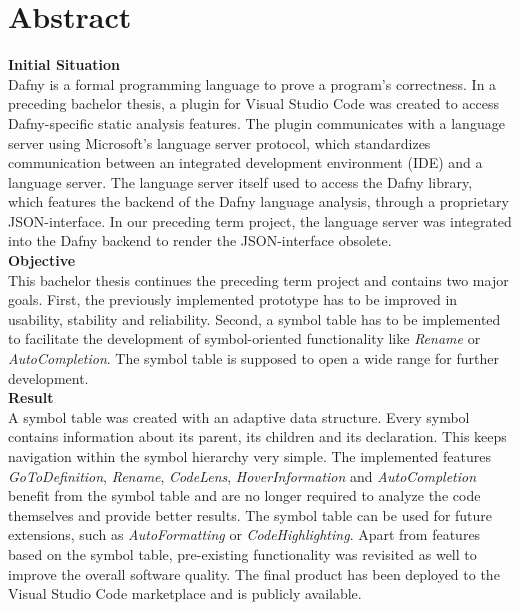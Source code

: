 \section{Abstract}
\label{section:abstract}

\textbf{Initial Situation}\\
Dafny is a formal programming language to prove a program's correctness.
In a preceding bachelor thesis, a plugin for Visual Studio Code was created to access Dafny-specific static analysis features.
The plugin communicates with a language server using Microsoft's language server protocol,
which standardizes communication between an integrated development environment (IDE) and a language server.
The language server itself used to access the Dafny library, which features the backend of the Dafny language analysis,
through a proprietary JSON-interface.
In our preceding term project, the language server was integrated into the Dafny backend to render the JSON-interface obsolete. \\

\textbf{Objective}\\
This bachelor thesis continues the preceding term project and contains two major goals.
First, the previously implemented prototype has to be improved in usability, stability and reliability.
Second, a symbol table has to be implemented to facilitate the development
of symbol-oriented functionality like \textit{Rename} or \textit{AutoCompletion}.
The symbol table is supposed to open a wide range for further development.\\

\textbf{Result}\\
A symbol table was created with an adaptive data structure.
Every symbol contains information about its parent, its children and its declaration.
This keeps navigation within the symbol hierarchy very simple.
The implemented features \textit{GoToDefinition}, \textit{Rename}, \textit{CodeLens}, \textit{HoverInformation} and \textit{AutoCompletion} benefit from the symbol table and are no longer required to analyze the code themselves and provide better results.
The symbol table can be used for future extensions, such as \textit{AutoFormatting} or \textit{CodeHighlighting}.
Apart from features based on the symbol table, pre-existing functionality was revisited as well to improve the overall software quality.
The final product has been deployed to the Visual Studio Code marketplace and is publicly available.
